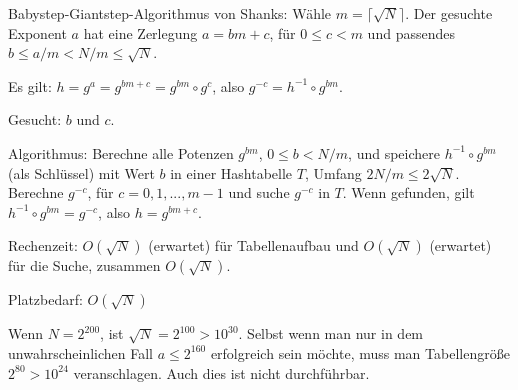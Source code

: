 \documentclass[a4paper]{article}
\begin{document}
\begin{multicols}{3}
        Babystep-Giantstep-Algorithmus von Shanks:
        Wähle $m=\lceil \sqrt{N}\rceil$. Der gesuchte Exponent $a$ hat eine Zerlegung $a=bm+c$, für $0\leq c < m$ und passendes $b\leq a/m < N/m\leq \sqrt{N}$.
        \begin{itemize*}
            \item Es gilt: $h=g^a=g^{bm+c}=g^{bm} \circ g^c$, also $g^{-c}=h^{-1}\circ g^{bm}$.
            \item Gesucht: $b$ und $c$.
            \item Algorithmus: Berechne alle Potenzen $g^{bm}$, $0\leq b < N/m$, und speichere $h^{-1}\circ g^{bm}$ (als Schlüssel) mit Wert $b$ in einer Hashtabelle $T$, Umfang $2N/m\leq 2\sqrt{N}$. Berechne $g^{-c}$, für $c=0,1,...,m-1$ und suche $g^{-c}$ in $T$. Wenn gefunden, gilt $h^{-1} \circ g^{bm}=g^{-c}$, also $h=g^{bm+c}$.
            \item Rechenzeit: $O(\sqrt{N})$ (erwartet) für Tabellenaufbau und $O(\sqrt{N})$ (erwartet) für die Suche, zusammen $O(\sqrt{N})$.
            \item Platzbedarf: $O(\sqrt{N})$
            \item Wenn $N=2^{200}$, ist $\sqrt{N}= 2^{100}> 10^{30}$. Selbst wenn man nur in dem unwahrscheinlichen Fall $a\leq 2^{160}$ erfolgreich sein möchte, muss man Tabellengröße $2^{80}> 10^{24}$ veranschlagen. Auch dies ist nicht durchführbar.
        \end{itemize*}


\end{multicols}
\end{document}
